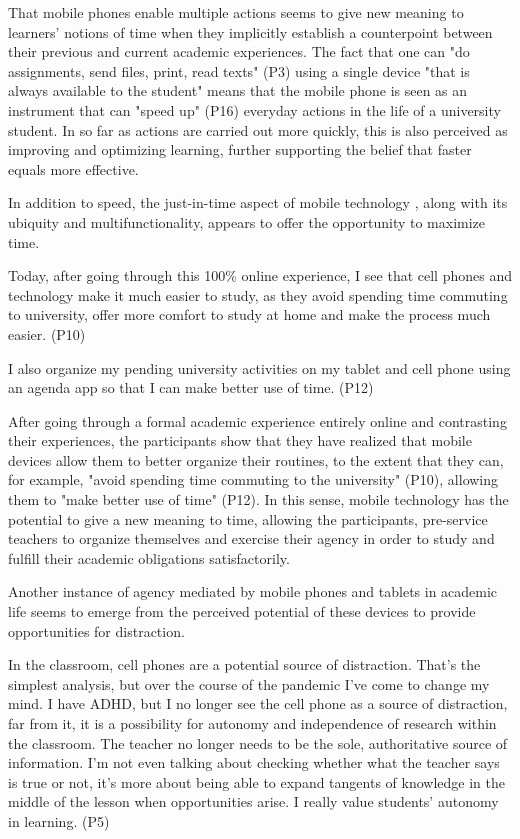 That mobile phones enable multiple actions seems to give new meaning to learners' notions of time when they implicitly establish a counterpoint between their previous and current academic experiences. The fact that one can "do assignments, send files, print, read texts" (P3) using a single device "that is always available to the student" means that the mobile phone is seen as an instrument that can "speed up" (P16) everyday actions in the life of a university student. In so far as actions are carried out more quickly, this is also perceived as improving and optimizing learning, further supporting the belief that faster equals more effective.

In addition to speed, the just-in-time aspect of mobile technology \cite{pegrum_mobile_2014,godwin-jones_smartphones_2017}, along with its ubiquity and multifunctionality, appears to offer the opportunity to maximize time.

Today, after going through this 100\% online experience, I see that cell phones and technology make it much easier to study, as they avoid spending time commuting to university, offer more comfort to study at home and make the process much easier. (P10)

I also organize my pending university activities on my tablet and cell phone using an agenda app so that I can make better use of time. (P12)

After going through a formal academic experience entirely online and contrasting their experiences, the participants show that they have realized that mobile devices allow them to better organize their routines, to the extent that they can, for example, "avoid spending time commuting to the university" (P10), allowing them to "make better use of time" (P12). In this sense, mobile technology has the potential to give a new meaning to time, allowing the participants, pre-service teachers to organize themselves and exercise their agency in order to study and fulfill their academic obligations satisfactorily.

Another instance of agency mediated by mobile phones and tablets in academic life seems to emerge from the perceived potential of these devices to provide opportunities for distraction.

In the classroom, cell phones are a potential source of distraction. That's the simplest analysis, but over the course of the pandemic I've come to change my mind. I have ADHD, but I no longer see the cell phone as a source of distraction, far from it, it is a possibility for autonomy and independence of research within the classroom. The teacher no longer needs to be the sole, authoritative source of information. I'm not even talking about checking whether what the teacher says is true or not, it's more about being able to expand tangents of knowledge in the middle of the lesson when opportunities arise. I really value students' autonomy in learning. (P5)

